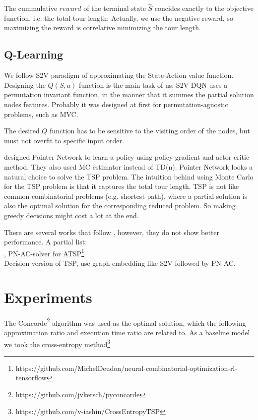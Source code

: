 \documentclass[10pt,a4paper,draft]{article}
\begin{document}
The cummulative $reward$ of the terminal state $\hat{S}$ concides exactly to the objective function, i.e. the total tour length:
Actually, we use the negative reward, so maximizing the reward is correlative minimizing the tour length.

\subsection{Q-Learning}
We follow S2V paradigm of approximating the State-Action value function.
Designing the $Q(S,a)$ function is the main task of us. S2V-DQN uses a permutation invariant function, in the manner that it summes the partial solution nodes features. Probably it was designed at first for permutation-agnostic problems, such as MVC.

The desired $Q$ function has to be sensitive to the visiting order of the nodes, but must not overfit to specific input order. 

\cite{bello16-tsp-pnac} designed Pointer Network to learn a policy using policy gradient and actor-critic method. They also used MC estimator instead of TD(n). Pointer Network looks a natural choice to solve the TSP problem. The intuition behind using Monte Carlo for the TSP problem is that it captures the total tour length. TSP is not like common combinatorial problems (e.g. shortest path), where a partial solution is also the optimal solution for the corresponding reduced problem. So making greedy decisions might cost a lot at the end.
 
There are several works that follow \cite{bello16-tsp-pnac}, however, they do not show better performance. 
A partial list: \\

\cite{deudon18-tsp-nr2opt}, PN-AC-solver for ATSP\footnote{https://github.com/MichelDeudon/neural-combinatorial-optimization-rl-tensorflow}  \\

Decision version of TSP, use graph-embedding like S2V followed by PN-AC.





\section{Experiments}
	The Concorde\footnote{https://github.com/jvkersch/pyconcorde} algorithm was used as the optimal solution, which the following approximation ratio and execution time ratio are related to. As a baseline model we took the cross-entropy method\footnote{https://github.com/v-iashin/CrossEntropyTSP}
\end{document}
